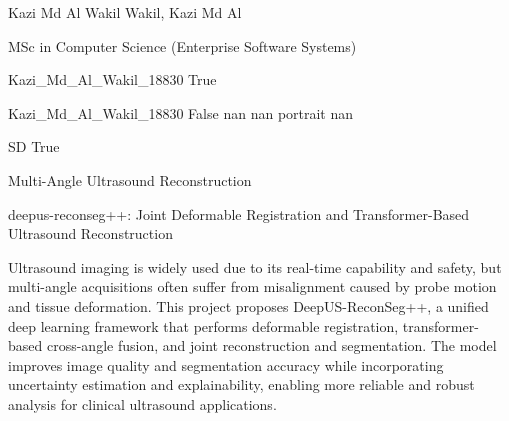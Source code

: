 
\begingroup{}\relax



\def\Key{Kazi_Md_Al_Wakil_18830}

{Kazi Md Al Wakil}
{Wakil, Kazi Md Al}

{MSc in Computer Science (Enterprise Software Systems)}

{Kazi_Md_Al_Wakil_18830}
{True}

{Kazi_Md_Al_Wakil_18830}
{False}
{nan}
{nan}
{portrait}
{nan}

{SD}
{True}

{Multi-Angle Ultrasound Reconstruction}

{deepus-reconseg++: Joint Deformable Registration and Transformer-Based Ultrasound Reconstruction}

{Ultrasound imaging is widely used due to its real-time capability and safety, but multi-angle acquisitions often suffer from misalignment caused by probe motion and tissue deformation. This project proposes DeepUS-ReconSeg++, a unified deep learning framework that performs deformable registration, transformer-based cross-angle fusion, and joint reconstruction and segmentation. The model improves image quality and segmentation accuracy while incorporating uncertainty estimation and explainability, enabling more reliable and robust analysis for clinical ultrasound applications.}

